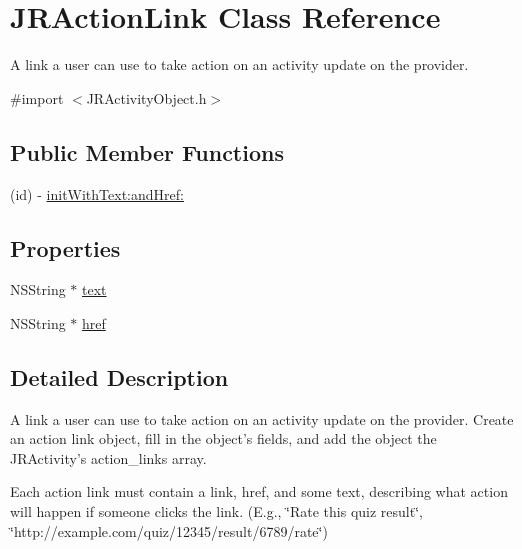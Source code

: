 \hypertarget{interface_j_r_action_link}{
\section{JRActionLink Class Reference}
\label{interface_j_r_action_link}
}


A link a user can use to take action on an activity update on the provider.  




{\ttfamily \#import $<$JRActivityObject.h$>$}

\subsection*{Public Member Functions}
\begin{DoxyCompactItemize}
\item 
(id) -\/ \hyperlink{interface_j_r_action_link_ae1f056641fd3302efbf23d89452553a5}{initWithText:andHref:}
\end{DoxyCompactItemize}
\subsection*{Properties}
\begin{DoxyCompactItemize}
\item 
NSString $\ast$ \hyperlink{interface_j_r_action_link_a062c02005f1c35e651ffbcab51c50b21}{text}
\item 
NSString $\ast$ \hyperlink{interface_j_r_action_link_a45489781731e5965e20fa66af0bd3072}{href}
\end{DoxyCompactItemize}


\subsection{Detailed Description}
A link a user can use to take action on an activity update on the provider. Create an action link object, fill in the object's fields, and add the object the JRActivity's action\_\-links array.

Each action link must contain a link, {\ttfamily href}, and some {\ttfamily text}, describing what action will happen if someone clicks the link. (E.g., \char`\"{}Rate this quiz result\char`\"{}, \char`\"{}http://example.com/quiz/12345/result/6789/rate\char`\"{}) 

